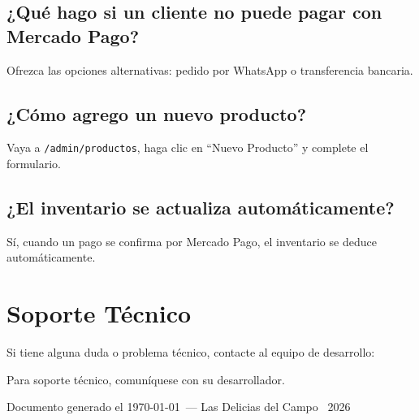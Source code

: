 \documentclass[12pt,a4paper]{article}
\begin{document}
\subsection{¿Qué hago si un cliente no puede pagar con Mercado Pago?}
Ofrezca las opciones alternativas: pedido por WhatsApp o transferencia bancaria.

\subsection{¿Cómo agrego un nuevo producto?}
Vaya a \texttt{/admin/productos}, haga clic en ``Nuevo Producto'' y complete el formulario.

\subsection{¿El inventario se actualiza automáticamente?}
Sí, cuando un pago se confirma por Mercado Pago, el inventario se deduce automáticamente.

\section{Soporte Técnico}

Si tiene alguna duda o problema técnico, contacte al equipo de desarrollo:

\begin{credentialbox}
\centering
\large Para soporte técnico, comuníquese con su desarrollador.
\end{credentialbox}

\vfill
\begin{center}
    \textcolor{cafe}{\small Documento generado el \today\ --- Las Delicias del Campo \textcopyright\ 2026}
\end{center}
\end{document}
